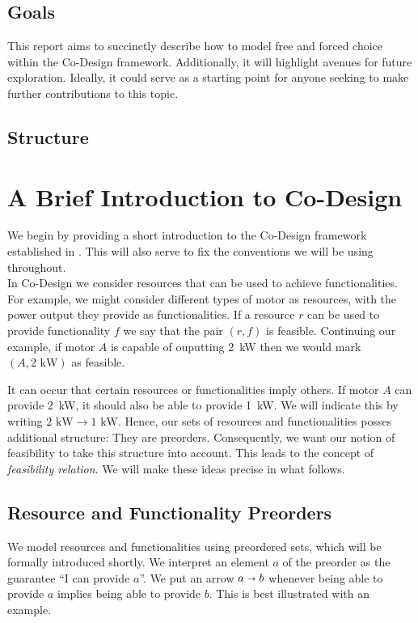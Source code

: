 \documentclass[12pt]{article}
\theoremstyle{definition}
\theoremstyle{plain}
\theoremstyle{plain}
\theoremstyle{plain}
\theoremstyle{plain}
\theoremstyle{remark}
\theoremstyle{remark}
\begin{document}
\subsection{Goals}
This report aims to succinctly describe how to model free and forced choice within the Co-Design framework. Additionally, it will highlight avenues for future exploration. Ideally, it could serve as a starting point for anyone seeking to make further contributions to this topic.

\subsection{Structure}

\section{A Brief Introduction to Co-Design}
We begin by providing a short introduction to the Co-Design framework established in \cite{Censi2015}. This will also serve to fix the conventions we will be using throughout. \\

In Co-Design we consider resources that can be used to achieve functionalities. For example, we might consider different types of motor as resources, with the power output they provide as functionalities. If a resource $r$ can be used to provide functionality $f$ we say that the pair $(r,f)$ is feasible. Continuing our example, if motor $A$ is capable of ouputting \mbox{2 kW} then we would mark $(A,\text{2 kW})$ as feasible.

It can occur that certain resources or functionalities imply others. If motor $A$ can provide \mbox{2 kW}, it should also be able to provide \mbox{1 kW}. We will indicate this by writing $2 \text{ kW} \rightarrow 1 \text{ kW}$. Hence, our sets of resources and functionalities posses additional structure: They are preorders. Consequently, we want our notion of feasibility to take this structure into account. This leads to the concept of \emph{feasibility relation}. We will make these ideas precise in what follows.

\subsection{Resource and Functionality Preorders}

We model resources and functionalities using preordered sets, which will be formally introduced shortly. We interpret an element $a$ of the preorder as the guarantee ``I can provide $a$''. We put an arrow $a \shortrightarrow b$ whenever being able to provide $a$ implies being able to provide $b$. This is best illustrated with an example.
\end{document}
